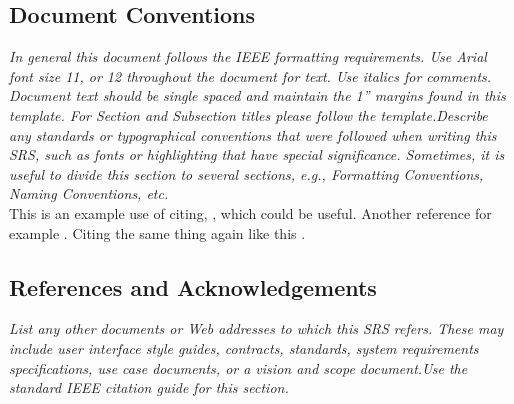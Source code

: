     \subsection{Document Conventions}
        \emph{In general this document follows the IEEE formatting requirements. Use Arial font size 11, or 12 throughout the document for text. Use italics for comments. Document text should be single spaced and maintain the 1” margins found in this template. For Section and Subsection titles please follow the template.\gnl Describe any standards or typographical conventions that were followed when writing this SRS, such as fonts or highlighting that have special significance. Sometimes, it is useful to divide this section to several sections, e.g., Formatting Conventions, Naming Conventions, etc.}\\
        This is an example use of citing, \cite{anotherone}, which could be useful. Another reference for example \cite{keyword}. Citing the same thing again like this \cite{anotherone}.
    \subsection{References and Acknowledgements}
        \emph{List any other documents or Web addresses to which this SRS refers. These may include user interface style guides, contracts, standards, system requirements specifications, use case documents, or a vision and scope document.\gnl Use the standard IEEE citation guide for this section.}

